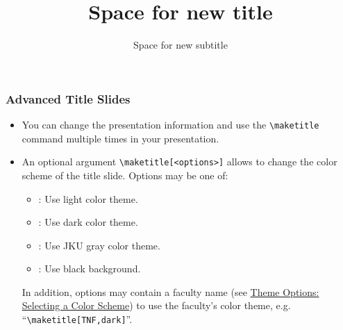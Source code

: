 \documentclass[utf8,aspectratio=169,ngerman,english]{beamer}
\begin{document}
\begin{frame}[containsverbatim,label={advanced-title-slides}]
\frametitle{Advanced Title Slides}

\begin{itemize}
\item You can change the presentation information and use the \verb+\maketitle+ command multiple times in your presentation.
\item An optional argument \verb|\maketitle[<options>]| allows to change the color scheme of the title slide. Options may be one of:
    \begin{itemize}
    \item {}: Use light color theme.
    \item {}: Use dark color theme.
    \item {}: Use JKU gray color theme.
    \item {}: Use black background.
    \end{itemize}
    In addition, options may contain a faculty name (see \hyperref[options:colorscheme]{Theme Options: Selecting a Color Scheme}) to use the faculty's color theme, e.g. ``\verb|\maketitle[TNF,dark]|''.
\end{itemize}
\end{frame}

\title{Space for new title}
\subtitle{Space for new subtitle}
\end{document}
